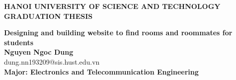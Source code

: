 \documentclass[Main.tex]{subfiles}
\begin{document}
\begin{titlepage}
    \thispagestyle{empty}
    \begin{center}

        {\textbf{\large{HANOI UNIVERSITY OF SCIENCE AND TECHNOLOGY }}}\\[4cm]

        {\textbf{\huge{GRADUATION THESIS}}}\\[1cm]
        {\textbf{\Large{Designing and building website to find rooms and roommates for students}}\\[1cm]

        {\textbf{\large{Nguyen Ngoc Dung}}}\\
        {\large{dung.nn193209@sis.hust.edu.vn}}\\[0.5cm]

        {\textbf{\large{Major: Electronics and Telecommunication Engineering}}}\\

        \vspace{2cm}
        \begin{table}[H]
            \centering
        \end{table}}
    \end{center}

\end{titlepage}
\end{document}
